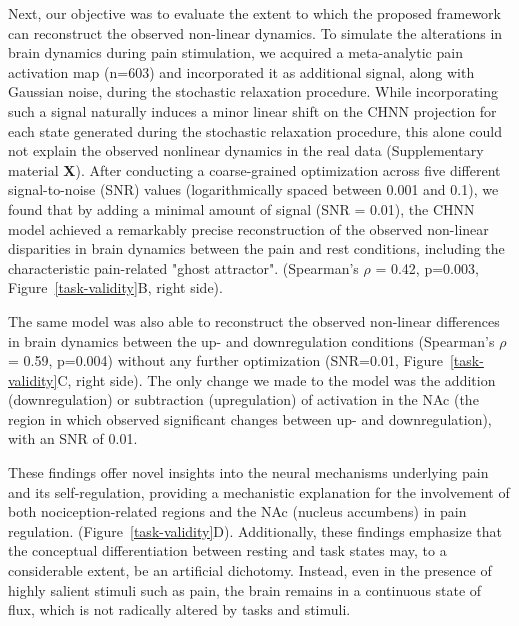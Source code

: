 \documentclass{article}
\begin{document}
Next, our objective was to evaluate the extent to which the proposed framework can reconstruct the observed non-linear
dynamics. To simulate the alterations in brain dynamics during pain stimulation, we acquired a meta-analytic pain
activation map \citep{zunhammer2021meta} (n=603) and incorporated it as additional signal, along with Gaussian noise,
during the stochastic relaxation procedure. While incorporating such a signal naturally induces a minor linear shift
on the CHNN projection for each state generated during the stochastic relaxation procedure, this alone could not explain
the observed nonlinear dynamics in the real data (Supplementary material \textbf{X}). After conducting a
coarse-grained optimization across five different signal-to-noise (SNR) values (logarithmically spaced between
0.001 and 0.1), we found that by adding a minimal amount of signal (SNR = 0.01), the CHNN model achieved a remarkably
precise reconstruction of the observed non-linear disparities in brain dynamics between the pain and rest conditions,
including the characteristic pain-related "ghost attractor". (Spearman's $\rho$ = 0.42, p=0.003,
Figure~\ref{task-validity}B, right side).

The same model was also able to reconstruct the observed non-linear differences in brain dynamics between the up- and
downregulation conditions (Spearman's $\rho$ = 0.59, p=0.004) without any further optimization (SNR=0.01,
Figure~\ref{task-validity}C, right side). The only change we made to the model was the addition (downregulation) or
subtraction (upregulation) of activation in the NAc (the region in which \citep{woo2015distinct} observed significant
changes between up- and downregulation), with an SNR of 0.01.

These findings offer novel insights into the neural mechanisms underlying pain and its self-regulation, providing a
mechanistic explanation for the involvement of both nociception-related regions and the NAc (nucleus accumbens) in pain
regulation. (Figure~\ref{task-validity}D). Additionally, these findings emphasize that the conceptual differentiation
between resting and task states may, to a considerable extent, be an artificial dichotomy. Instead, even in the presence of highly salient
stimuli such as pain, the brain remains in a continuous state of flux, which is not radically altered by tasks and stimuli.

\end{document}
